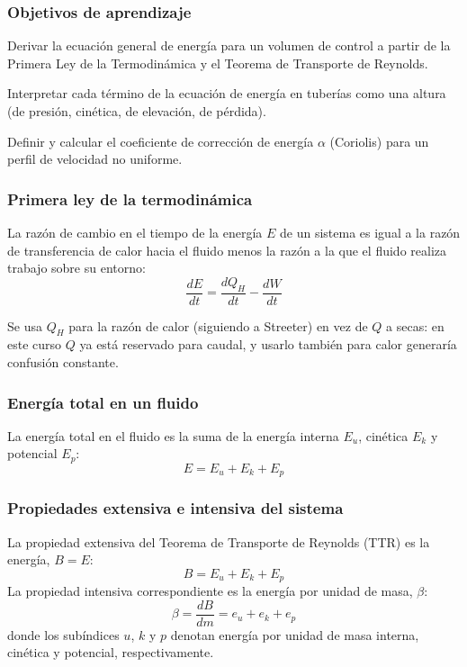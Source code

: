 \documentclass{ltx-talk}
\title{\icv@titulo}
\subtitle{\icv@subtitulo}
\author{\icv@profesor}
\institute{\icv@asignatura}
\date{\icv@periodo}
\begin{document}
\begin{frame}
  \maketitle[framestyle = wallpaper, horizontal-alignment = left]
\end{frame}

\begin{frame}
  \frametitle{Objetivos de aprendizaje}
  \begin{icvobjectives}
    \item Derivar la ecuación general de energía para un volumen de
      control a partir de la Primera Ley de la Termodinámica y el
      Teorema de Transporte de Reynolds.
    \item Interpretar cada término de la ecuación de energía en
      tuberías como una altura (de presión, cinética, de elevación,
      de pérdida).
    \item Definir y calcular el coeficiente de corrección de energía
      $\alpha$ (Coriolis) para un perfil de velocidad no uniforme.
  \end{icvobjectives}
\end{frame}

\begin{frame}
  \frametitle{Primera ley de la termodinámica}
  La razón de cambio en el tiempo de la energía $E$ de un sistema es
  igual a la razón de transferencia de calor hacia el fluido menos la
  razón a la que el fluido realiza trabajo sobre su entorno:
  \[
    \frac{dE}{dt} = \frac{dQ_H}{dt} - \frac{dW}{dt}
  \]

  \vspace{0.5em}
  \begin{icvnote}[Notación]
  Se usa $Q_H$ para la razón de calor (siguiendo a Streeter) en vez de
  $Q$ a secas: en este curso $Q$ ya está reservado para caudal, y usarlo
  también para calor generaría confusión constante.
  \end{icvnote}
\end{frame}

\begin{frame}
  \frametitle{Energía total en un fluido}
  La energía total en el fluido es la suma de la energía interna $E_u$,
  cinética $E_k$ y potencial $E_p$:
  \[
    E = E_u + E_k + E_p
  \]
\end{frame}

\begin{frame}
  \frametitle{Propiedades extensiva e intensiva del sistema}
  La propiedad extensiva del Teorema de Transporte de Reynolds (TTR) es
  la energía, $B = E$:
  \[
    B = E_u + E_k + E_p
  \]
  La propiedad intensiva correspondiente es la energía por unidad de
  masa, $\beta$:
  \[
    \beta = \frac{dB}{dm} = e_u + e_k + e_p
  \]
  donde los subíndices $u$, $k$ y $p$ denotan energía por unidad de masa
  interna, cinética y potencial, respectivamente.
\end{frame}
\end{document}
